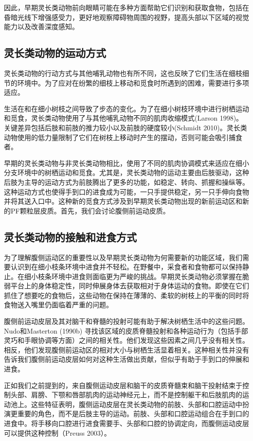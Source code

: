 因此，早期灵长类动物前向眼睛可能在多种方面帮助它们识别和获取食物，包括在昏暗光线下增强感受力，更好地观察障碍物周围的视野，提高头部以下区域的视觉能力以及改善深度感知。

\subsection{灵长类动物的运动方式}
灵长类动物的行动方式与其他哺乳动物也有所不同，这也反映了它们生活在细枝细节的环境中。为了应对在纷繁的细枝上移动和觅食时所遇到的困难，需要进行多项适应。

生活在和在细小树枝之间导致了步态的变化。为了在细小树枝环境中进行树栖运动和觅食，灵长类动物使用了与其他哺乳动物不同的肌肉收缩模式(Larson 1998)。关键差异包括后肢和前肢的推力较小以及前肢的硬度较小(Schmidt 2010)。灵长类动物使用的低力量限制了它们在树枝上移动时产生的摆动，否则可能会吸引捕食者。

早期的灵长类动物与非灵长类动物相比，使用了不同的肌肉协调模式来适应在细小分支环境中的树栖运动和觅食。尤其是，灵长类动物的运动主要由后肢驱动，这种后肢为主导的运动方式为前肢腾出了更多的功能，如稳定、转向、抓握和操纵等。这种运动方式也使得手到口的进食成为可能，一只手提供稳定，另一只手伸向食物并将其送入口中。这种新的觅食方式涉及到早期灵长类动物出现的新前运动区和新的PF颗粒层皮质。首先，我们会讨论腹侧前运动皮质。

\subsection{灵长类动物的接触和进食方式}
为了理解腹侧运动区的重要性以及早期灵长类动物为何需要新的功能区域，我们需要认识到在细小枝条环境中进食并不轻松。在野餐中，采食者和食物都可以保持静止。在细小枝条环境中进食则面临更为严峻的挑战。早期灵长类动物必须掌握在脆弱平台上的身体稳定性，同时伸展身体去获取相对于身体运动的食物。即使在它们抓住了想要吃的食物后，这些动物在保持在薄薄的、柔软的树枝上的平衡的同时将食物送入嘴里仍面临着严重的问题。

腹侧前运动皮层及其对脑干和脊髓的投射可能有助于解决树栖生活中的这些问题。Nudo和Masterton (1990b) 寻找该区域的皮质脊髓投射和各种运动行为（包括手部灵巧和手眼协调等方面）之间的相关性。他们发现这些因素之间几乎没有相关性。相反，他们发现腹侧前运动区的相对大小与树栖生活显着相关。这种相关性并没有告诉我们腹侧前运动皮层如何对这种生活做出贡献，但似乎有助于手到口的伸展和进食。

正如我们之前提到的，来自腹侧运动皮层和脑干的皮质脊髓束和脑干投射结束于控制头部、肩膀、下颚和唇部肌肉的运动神经元上，而不是控制躯干和后肢肌肉的运动池上。这些特征表明，腹侧运动皮层在灵长类动物的前肢、头部和口腔运动中扮演更重要的角色，而不是后肢主导的运动。前肢、头部和口腔运动组合在手到口的进食中。将手移向口腔进行进食需要手、头部和口腔的协调定向，而腹侧运动皮层可以提供这种控制（Preuss 2003）。

